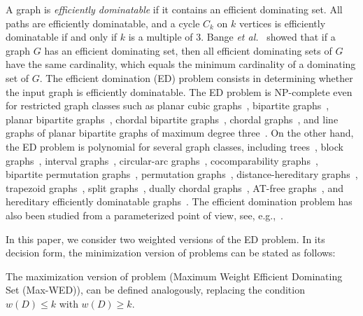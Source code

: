 \documentclass[]{elsarticle}
\newcommand{\NP}{\textsf{NP}}
\begin{document}
A graph is \emph{efficiently dominatable} if it contains an efficient dominating set.
All paths are efficiently dominatable, and a cycle $C_k$ on $k$ vertices is efficiently dominatable if and only if $k$ is a multiple of $3$.
Bange \emph{et al.}~\cite{BBS88} showed that if a graph $G$ has an efficient dominating set, then all efficient dominating sets of $G$ have the same cardinality, which equals the minimum cardinality of a dominating set of $G$. 
The efficient domination (ED) problem consists in determining whether the input graph is efficiently dominatable. 
The ED problem is \NP-complete even for restricted graph classes such as planar cubic graphs~\cite{Kratochvil91}, bipartite graphs~\cite{YL96}, planar bipartite graphs~\cite{LT02}, chordal bipartite graphs~\cite{LT02}, chordal graphs~\cite{YL96}, and line graphs of planar bipartite graphs of maximum degree three~\cite{BHN}.
On the other hand, the ED problem is polynomial for several graph classes, including trees~\cite{BBS88,FH91}, block graphs~\cite{YL96}, interval graphs~\cite{CL94, CRC95, KE00, KMM95}, circular-arc graphs~\cite{CL94,KE00}, cocomparability graphs~\cite{C97,CRC95}, bipartite permutation graphs~\cite{LT02}, permutation graphs~\cite{LLT97}, distance-hereditary graphs~\cite{LT02}, trapezoid graphs~\cite{LLT97,L98}, split graphs~\cite{CL93}, dually chordal graphs~\cite{BLR}, AT-free graphs~\cite{BLR,BKM99}, and hereditary efficiently dominatable graphs~\cite{Milanic}.
The efficient domination problem has also been studied from a parameterized point of view, see, e.g.,~\cite{Cesati,Guo-Niedermeier}.

In this paper, we consider two weighted versions of the ED problem.
In its decision form, the minimization version of problems can be stated as follows:

\medskip
\begin{center}
\end{center}
\medskip

The maximization version of problem ({\sc Maximum Weight Efficient Dominating Set} \hbox{\sc (Max-WED)}), can be defined analogously, replacing the condition $w(D) \le k$ with $w(D) \ge k$.
\end{document}
